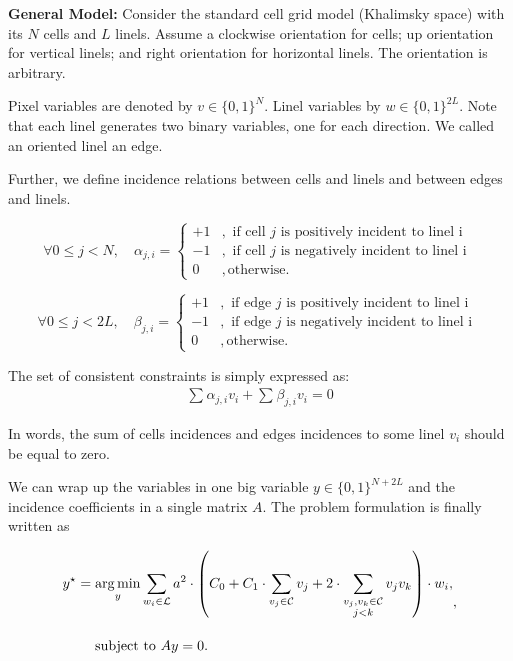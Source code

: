 \textbf{General Model:} 	Consider the standard cell grid model (Khalimsky space) with its $N$ cells and $L$ linels. Assume a clockwise orientation for cells; up orientation for vertical linels; and right orientation for horizontal linels. The orientation is arbitrary. 
	
	Pixel variables are denoted by $v \in \{0,1\}^N$. Linel variables by $w \in \{0,1\}^{2L}$. Note that each linel generates two binary variables, one for each direction. We called an oriented linel an edge.
			
	Further, we define incidence relations between cells and linels and between edges and linels.
	
	\[ \forall 0 \leq j < N, \quad
			\alpha_{j,i} = \left\{ 		\begin{array}{ll}
											+1&, \text{ if cell $j$ is positively incident to linel i }\\
											-1&,\text{ if cell $j$ is negatively incident to linel i }\\
											0&,\text{otherwise}.						
										\end{array}\right.
	\]
	
	\[\forall 0 \leq j < 2L, \quad
			\beta_{j,i} = \left\{ 		\begin{array}{ll}
											+1&, \text{ if edge $j$ is positively incident to linel i }\\
											-1&,\text{ if edge $j$ is negatively incident to linel i }\\
											0&,\text{otherwise}.						
										\end{array}\right.
	\]	

	The set of consistent constraints is simply expressed as:
	\begin{align*}
		\sum_{}{\alpha_{j,i}v_i} + \sum_{}{\beta_{j,i}v_i} = 0
	\end{align*}
	
	In words, the sum of cells incidences and edges incidences to some linel $v_i$ should be equal to zero. 
	
	We can wrap up the variables in one big variable $y \in \{0,1\}^{N+2L}$ and the incidence coefficients in a single matrix $A$. The problem formulation is finally written as


	\begin{equation}
	\begin{aligned}
		y^\star &= \operatorname*{arg\,min}_{y} \sum_{w_i \in \mathcal{L}}{ a^2 \cdot \left( C_0 + C_1 \cdot \sum_{v_j \in \mathcal{C}}{v_j} + 2 \cdot \sum_{ \substack{v_j,v_k \in \mathcal{C} \\ j<k} }{v_jv_k}  \right) } \cdot w_i,\\[1em]
	&\quad \text{ subject to } Ay=0.
	\end{aligned},
	\label{eq:global-formulation}
	\end{equation}
	
